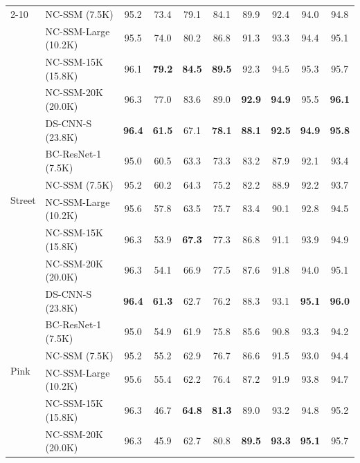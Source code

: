 \documentclass[journal]{IEEEtran}
\begin{document}
\begin{table}[t]
\begin{tabular}{ll|cccccccc}
\cmidrule{2-10}
  & NC-SSM (7.5K)          & 95.2 & 73.4 & 79.1 & 84.1 & 89.9 & 92.4 & 94.0 & 94.8 \\
  & NC-SSM-Large (10.2K)   & 95.5 & 74.0 & 80.2 & 86.8 & 91.3 & 93.3 & 94.4 & 95.1 \\
  & NC-SSM-15K (15.8K) & 96.1 & \textbf{79.2} & \textbf{84.5} & \textbf{89.5} & 92.3 & 94.5 & 95.3 & 95.7 \\
  & NC-SSM-20K (20.0K) & 96.3 & 77.0 & 83.6 & 89.0 & \textbf{92.9} & \textbf{94.9} & 95.5 & \textbf{96.1} \\
\midrule
\multirow{6}{*}{Street}
  & DS-CNN-S (23.8K)       & \textbf{96.4} & \textbf{61.5} & 67.1 & \textbf{78.1} & \textbf{88.1} & \textbf{92.5} & \textbf{94.9} & \textbf{95.8} \\
  & BC-ResNet-1 (7.5K)     & 95.0 & 60.5 & 63.3 & 73.3 & 83.2 & 87.9 & 92.1 & 93.4 \\
\cmidrule{2-10}
  & NC-SSM (7.5K)          & 95.2 & 60.2 & 64.3 & 75.2 & 82.2 & 88.9 & 92.2 & 93.7 \\
  & NC-SSM-Large (10.2K)   & 95.6 & 57.8 & 63.5 & 75.7 & 83.4 & 90.1 & 92.8 & 94.5 \\
  & NC-SSM-15K (15.8K) & 96.3 & 53.9 & \textbf{67.3} & 77.3 & 86.8 & 91.1 & 93.9 & 94.9 \\
  & NC-SSM-20K (20.0K) & 96.3 & 54.1 & 66.9 & 77.5 & 87.6 & 91.8 & 94.0 & 95.1 \\
\midrule
\multirow{6}{*}{Pink}
  & DS-CNN-S (23.8K)       & \textbf{96.4} & \textbf{61.3} & 62.7 & 76.2 & 88.3 & 93.1 & \textbf{95.1} & \textbf{96.0} \\
  & BC-ResNet-1 (7.5K)     & 95.0 & 54.9 & 61.9 & 75.8 & 85.6 & 90.8 & 93.3 & 94.2 \\
\cmidrule{2-10}
  & NC-SSM (7.5K)          & 95.2 & 55.2 & 62.9 & 76.7 & 86.6 & 91.5 & 93.0 & 94.4 \\
  & NC-SSM-Large (10.2K)   & 95.6 & 55.4 & 62.2 & 76.4 & 87.2 & 91.9 & 93.8 & 94.7 \\
  & NC-SSM-15K (15.8K) & 96.3 & 46.7 & \textbf{64.8} & \textbf{81.3} & 89.0 & 93.2 & 94.8 & 95.2 \\
  & NC-SSM-20K (20.0K) & 96.3 & 45.9 & 62.7 & 80.8 & \textbf{89.5} & \textbf{93.3} & \textbf{95.1} & 95.7 \\
\bottomrule
\end{tabular}
\end{table}
\end{document}
